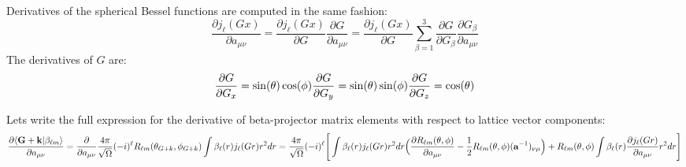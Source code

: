 Derivatives of the spherical Bessel functions are computed in the same fashion\+: \[ \frac{\partial j_{\ell}(Gx)}{\partial a_{\mu \nu}} = \frac{\partial j_{\ell}(Gx)}{\partial G} \frac{\partial G} {\partial a_{\mu \nu}} = \frac{\partial j_{\ell}(Gx)}{\partial G} \sum_{\beta=1}^{3}\frac{\partial G}{\partial G_{\beta}} \frac{\partial G_{\beta}} {\partial a_{\mu \nu}} \] The derivatives of $ G $ are\+: \[ \frac{\partial G}{\partial G_{x}} = \sin(\theta)\cos(\phi) \\ \frac{\partial G}{\partial G_{y}} = \sin(\theta)\sin(\phi) \\ \frac{\partial G}{\partial G_{z}} = \cos(\theta) \]

Let\textquotesingle{}s write the full expression for the derivative of beta-\/projector matrix elements with respect to lattice vector components\+: \[ \frac{\partial \langle {\bf G+k}|\beta_{\ell m} \rangle} {\partial a_{\mu \nu}} = \frac{\partial} {\partial a_{\mu \nu}} \frac{4\pi}{\sqrt{\Omega}}(-i)^{\ell} R_{\ell m}(\theta_{G+k}, \phi_{G+k}) \int \beta_{\ell}(r) j_{\ell}(Gr) r^2 dr =\\ \frac{4\pi}{\sqrt{\Omega}} (-i)^{\ell} \Bigg[ \int \beta_{\ell}(r) j_{\ell}(Gr) r^2 dr \Big( \frac{\partial R_{\ell m}(\theta, \phi)}{\partial a_{\mu \nu}} - \frac{1}{2} R_{\ell m}(\theta, \phi) ({\bf a}^{-1})_{\nu \mu} \Big) + R_{\ell m}(\theta, \phi) \int \beta_{\ell}(r) \frac{\partial j_{\ell}(Gr)}{\partial a_{\mu \nu}} r^2 dr \Bigg] \] 